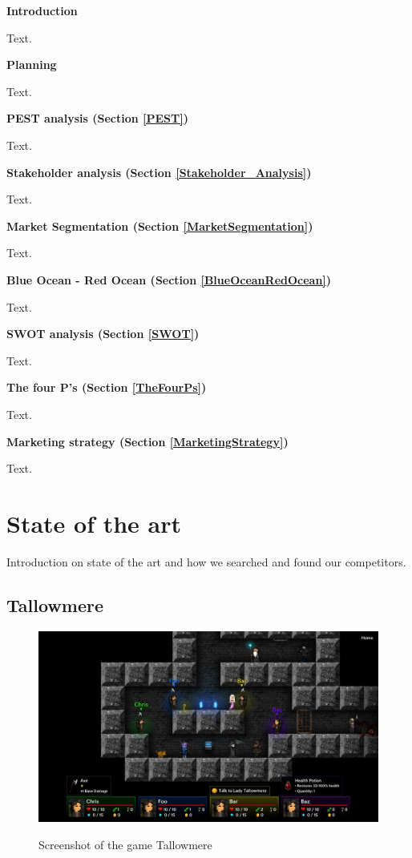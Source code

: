 \documentclass[12p]{article}
\begin{document}
\textbf{Introduction}

Text. \medskip

\textbf{Planning}

Text. \medskip

\textbf{PEST analysis (Section \ref{PEST})}

Text. \medskip

\textbf{Stakeholder analysis (Section \ref{Stakeholder_Analysis})}

Text. \medskip

\textbf{Market Segmentation (Section \ref{MarketSegmentation})}

Text. \medskip

\textbf{Blue Ocean - Red Ocean (Section \ref{BlueOceanRedOcean})}

Text. \medskip

\textbf{SWOT analysis (Section \ref{SWOT})}

Text. \medskip

\textbf{The four P's (Section \ref{TheFourPs})}

Text.  \medskip

\textbf{Marketing strategy (Section \ref{MarketingStrategy})}

Text.


\newpage
\section{State of the art}

Introduction on state of the art and how we searched and found our competitors.


\subsection{Tallowmere} \label{StateOfTheArt_Tallowmere}

\begin{figure}[h]
    \center
    \includegraphics[width=1\textwidth]{StateOfTheArtScreenshots/tallowmere}
    \label{StateOfTheArt_Screenshots_Tallowmere}
    \caption{Screenshot of the game Tallowmere \cite{TallowmereScreenshot}}
\end{figure}
\end{document}
